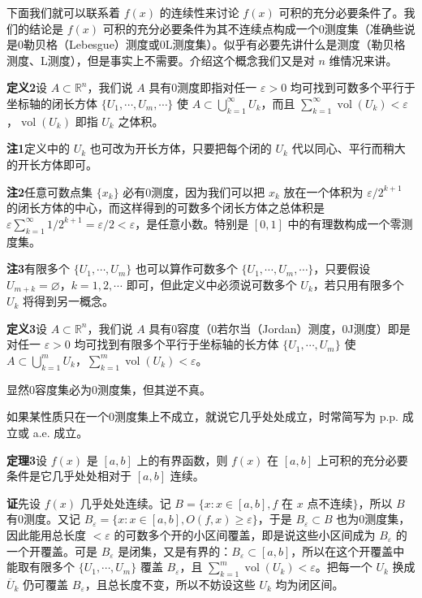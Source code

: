 下面我们就可以联系着 $f(x)$ 的连续性来讨论 $f(x)$ 可积的充分必要条件了。我们的结论是 $f(x)$ 可积的充分必要条件为其不连续点构成一个0测度集（准确些说是0勒贝格（Lebesgue）测度或0L测度集）。似乎有必要先讲什么是测度（勒贝格测度、L测度），但是事实上不需要。介绍这个概念我们又是对 $n$ 维情况来讲。

\noindent\textbf{定义2}\quad 设 $A\subset\mathbb R^n$，我们说 $A$ 具有0测度即指对任一 $\varepsilon>0$ 均可找到可数多个平行于坐标轴的闭长方体 $\{U_1,\cdots,U_m,\cdots\}$ 使 $A\subset\bigcup_{k=1}^{\infty}U_k$，而且 $\sum_{k=1}^{\infty}\operatorname{vol}(U_k)<\varepsilon$，$\operatorname{vol}(U_k)$ 即指 $U_k$ 之体积。

\noindent\textbf{注1}\quad 定义中的 $U_k$ 也可改为开长方体，只要把每个闭的 $U_k$ 代以同心、平行而稍大的开长方体即可。

\noindent\textbf{注2}\quad 任意可数点集 $\{x_k\}$ 必有0测度，因为我们可以把 $x_k$ 放在一个体积为 $\varepsilon/2^{k+1}$ 的闭长方体的中心，而这样得到的可数多个闭长方体之总体积是 $\varepsilon\sum_{k=1}^{\infty}1/2^{k+1}=\varepsilon/2<\varepsilon$，是任意小数。特别是 $[0,1]$ 中的有理数构成一个零测度集。

\noindent\textbf{注3}\quad 有限多个 $\{U_1,\cdots,U_m\}$ 也可以算作可数多个 $\{U_1,\cdots,U_m,\cdots\}$，只要假设 $U_{m+k}=\varnothing$，$k=1,2,\cdots$ 即可，但此定义中必须说可数多个 $U_k$，若只用有限多个 $U_k$ 将得到另一概念。

\noindent\textbf{定义3}\quad 设 $A\subset\mathbb R^n$，我们说 $A$ 具有0容度（0若尔当（Jordan）测度，0J测度）即是对任一 $\varepsilon>0$ 均可找到有限多个平行于坐标轴的长方体 $\{U_1,\cdots,U_m\}$ 使 $A\subset\bigcup_{k=1}^{m}U_k$，$\sum_{k=1}^{m}\operatorname{vol}(U_k)<\varepsilon$。

显然0容度集必为0测度集，但其逆不真。

如果某性质只在一个0测度集上不成立，就说它几乎处处成立，时常简写为 p.p. 成立或 a.e. 成立。

\noindent\textbf{定理3}\quad 设 $f(x)$ 是 $[a,b]$ 上的有界函数，则 $f(x)$ 在 $[a,b]$ 上可积的充分必要条件是它几乎处处相对于 $[a,b]$ 连续。

\noindent\textbf{证}\quad 先设 $f(x)$ 几乎处处连续。记 $B=\{x:x\in[a,b],f\text{ 在 }x\text{ 点不连续}\}$，所以 $B$ 有0测度。又记 $B_\varepsilon=\{x:x\in[a,b],O(f,x)\ge\varepsilon\}$，于是 $B_\varepsilon\subset B$ 也为0测度集，因此能用总长度 $<\varepsilon$ 的可数多个开的⼩区间覆盖，即是说这些小区间成为 $B_\varepsilon$ 的一个开覆盖。可是 $B_\varepsilon$ 是闭集，又是有界的：$B_\varepsilon\subset[a,b]$，所以在这个开覆盖中能取有限多个 $\{U_1,\cdots,U_m\}$ 覆盖 $B_\varepsilon$，且 $\sum_{k=1}^{m}\operatorname{vol}(U_k)<\varepsilon$。把每一个 $U_k$ 换成 $\overline U_k$ 仍可覆盖 $B_\varepsilon$，且总长度不变，所以不妨设这些 $U_k$ 均为闭区间。

